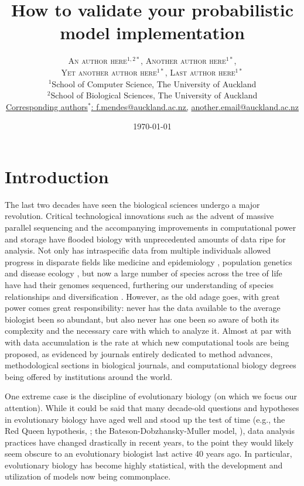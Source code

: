 \documentclass[oneside]{article}
\title{How to validate your probabilistic model implementation} %
\author{\textsc{An author here$^{1,2*}$}, \textsc{Another author
    here$^{1*}$}, \\ \textsc{Yet another author here$^{1*}$},
  \textsc{Last author here$^{1*}$} \\
\small $^1$School of Computer Science, The University of Auckland\\
\small $^2$School of Biological Sciences, The University of Auckland\\
\small
\href{mailto:f.mendes@auckland.ac.nz}{Corresponding authors$^*$: f.mendes@auckland.ac.nz,}
\href{mailto:f.mendes@auckland.ac.nz}{another.email@auckland.ac.nz}
}
\date{\today} %
\begin{document}
\maketitle


\section*{Introduction}
The last two decades have seen the biological sciences undergo a major revolution.
Critical technological innovations such as the advent of massive
parallel sequencing and the accompanying improvements in computational
power and storage have flooded biology with unprecedented amounts of
data ripe for analysis.
Not only has intraspecific data from multiple individuals allowed
progress in disparate fields like medicine and epidemiology
\citep[e.g.,][]{1000g,humanmicrobiome,neafsey15}, population genetics
\citep[e.g.,][]{lynch07,lack16,demanuel16} and disease ecology
\citep[e.g.][]{rosenblum13,bates18}, but now a large number of species
across the tree of life have had their genomes sequenced, furthering
our understanding of species relationships and diversification
\citep[e.g.,][]{martin13,brawand14,jarvis14,novikova16,pease2016,kawahara19,upham19}.
However, as the old adage goes, with great power comes great
responsibility: never has the data available to the average biologist
been so abundant, but also never has one been so aware of both its
complexity and the necessary care with which to analyze it.
Almost at par with with data accumulation is the rate at which new
computational tools are being proposed, as evidenced by journals
entirely dedicated to method advances, methodological sections in
biological journals, and computational biology degrees being offered
by institutions around the world.

One extreme case is the discipline of evolutionary biology (on which
we focus our attention).
While it could be said that many decade-old questions and hypotheses
in evolutionary biology have aged well and stood up the test of time
(e.g., the Red Queen hypothesis,
\citealt{vanvalen73,lively87,morran11,gibson15}; the
Bateson-Dobzhansky-Muller model,
\citealt{dob36,muller40,hopkins12,roda17}), data analysis practices
have changed drastically in recent years, to the point they would
likely seem obscure to an evolutionary biologist last active 40 years
ago.
In particular, evolutionary biology has become highly statistical,
with the development and utilization of models now being commonplace.
\end{document}
